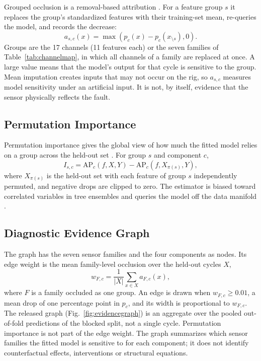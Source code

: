 \documentclass[journal]{IEEEtran}
\begin{document}
Grouped occlusion is a removal-based attribution \cite{Covert2021RemovalBased}. For
a feature group $s$ it replaces the group's standardized features with their
training-set mean, re-queries the model, and records the decrease:
\begin{equation}
a_{s,c}(x)=\max \left(p_c(x)-p_c(x_{\setminus s}),0\right).
\label{eq:occlusion}
\end{equation}
Groups are the 17 channels (11 features each) or the seven families of
Table~\ref{tab:channelmap}, in which all channels of a family are replaced at once.
A large value means that the model's output for that cycle is sensitive to the
group. Mean imputation creates inputs that may not occur on the rig, so $a_{s,c}$
measures model sensitivity under an artificial input. It is not, by itself,
evidence that the sensor physically reflects the fault.

\subsection{Permutation Importance}
\label{sec:permutation}

Permutation importance gives the global view of how much the fitted model relies on
a group across the held-out set \cite{Fisher2019ModelReliance}. For group $s$ and
component $c$,
\begin{equation}
I_{s,c}=\mathrm{AP}_c(f,X,Y)-\mathrm{AP}_c(f,X_{\pi(s)},Y),
\label{eq:permutation}
\end{equation}
where $X_{\pi(s)}$ is the held-out set with each feature of group $s$ independently
permuted, and negative drops are clipped to zero. The estimator is biased toward
correlated variables in tree ensembles \cite{Strobl2007Bias} and queries the model
off the data manifold \cite{Hooker2021Unrestricted}.

\subsection{Diagnostic Evidence Graph}
\label{sec:graph}

The graph has the seven sensor families and the four components as nodes. Its edge
weight is the mean family-level occlusion over the held-out cycles $X$,
\begin{equation}
w_{F,c}=\frac{1}{|X|}\sum_{x\in X} a_{F,c}(x),
\label{eq:edgeweight}
\end{equation}
where $F$ is a family occluded as one group. An edge is drawn when
$w_{F,c}\ge 0.01$, a mean drop of one percentage point in $p_c$, and its width is
proportional to $w_{F,c}$. The released graph (Fig.~\ref{fig:evidencegraph}) is an
aggregate over the pooled out-of-fold predictions of the blocked split, not a
single cycle. Permutation importance is not part of the edge weight. The graph
summarizes which sensor families the fitted model is sensitive to for each
component; it does not identify counterfactual effects, interventions or
structural equations.
\end{document}
